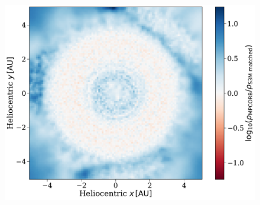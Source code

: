 \documentclass[twocolumn, twocolappendix]{aastex631}
\begin{document}
\begin{figure}[htb]
    \centering
    \includegraphics[width=\columnwidth]{density_residuals.pdf}
    \caption{}
    \label{fig:density_residuals}
\end{figure}
\end{document}

